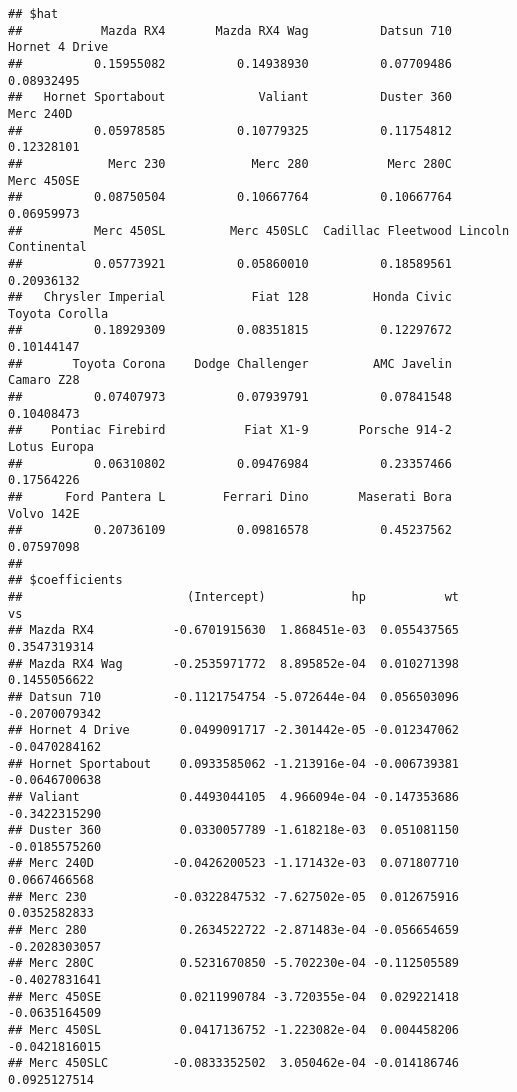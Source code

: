 \documentclass[]{article}
\begin{document}
\begin{verbatim}
## $hat
##           Mazda RX4       Mazda RX4 Wag          Datsun 710      Hornet 4 Drive 
##          0.15955082          0.14938930          0.07709486          0.08932495 
##   Hornet Sportabout             Valiant          Duster 360           Merc 240D 
##          0.05978585          0.10779325          0.11754812          0.12328101 
##            Merc 230            Merc 280           Merc 280C          Merc 450SE 
##          0.08750504          0.10667764          0.10667764          0.06959973 
##          Merc 450SL         Merc 450SLC  Cadillac Fleetwood Lincoln Continental 
##          0.05773921          0.05860010          0.18589561          0.20936132 
##   Chrysler Imperial            Fiat 128         Honda Civic      Toyota Corolla 
##          0.18929309          0.08351815          0.12297672          0.10144147 
##       Toyota Corona    Dodge Challenger         AMC Javelin          Camaro Z28 
##          0.07407973          0.07939791          0.07841548          0.10408473 
##    Pontiac Firebird           Fiat X1-9       Porsche 914-2        Lotus Europa 
##          0.06310802          0.09476984          0.23357466          0.17564226 
##      Ford Pantera L        Ferrari Dino       Maserati Bora          Volvo 142E 
##          0.20736109          0.09816578          0.45237562          0.07597098 
## 
## $coefficients
##                       (Intercept)            hp           wt            vs
## Mazda RX4           -0.6701915630  1.868451e-03  0.055437565  0.3547319314
## Mazda RX4 Wag       -0.2535971772  8.895852e-04  0.010271398  0.1455056622
## Datsun 710          -0.1121754754 -5.072644e-04  0.056503096 -0.2070079342
## Hornet 4 Drive       0.0499091717 -2.301442e-05 -0.012347062 -0.0470284162
## Hornet Sportabout    0.0933585062 -1.213916e-04 -0.006739381 -0.0646700638
## Valiant              0.4493044105  4.966094e-04 -0.147353686 -0.3422315290
## Duster 360           0.0330057789 -1.618218e-03  0.051081150 -0.0185575260
## Merc 240D           -0.0426200523 -1.171432e-03  0.071807710  0.0667466568
## Merc 230            -0.0322847532 -7.627502e-05  0.012675916  0.0352582833
## Merc 280             0.2634522722 -2.871483e-04 -0.056654659 -0.2028303057
## Merc 280C            0.5231670850 -5.702230e-04 -0.112505589 -0.4027831641
## Merc 450SE           0.0211990784 -3.720355e-04  0.029221418 -0.0635164509
## Merc 450SL           0.0417136752 -1.223082e-04  0.004458206 -0.0421816015
## Merc 450SLC         -0.0833352502  3.050462e-04 -0.014186746  0.0925127514

\end{verbatim}
\end{document}
